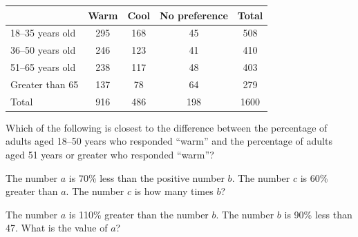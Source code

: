 \vspace{1em}
\begin{center}
    

\begin{tabular}{|l|c|c|c|c|}
\hline
 & Warm & Cool & No preference & Total \\
\hline
18--35 years old & 295 & 168 & 45 & 508 \\
36--50 years old & 246 & 123 & 41 & 410 \\
51--65 years old & 238 & 117 & 48 & 403 \\
Greater than 65 & 137 & 78 & 64 & 279 \\
\hline
Total & 916 & 486 & 198 & 1600 \\
\hline
\end{tabular}
\end{center}

\vspace{1em}

Which of the following is closest to the difference between the percentage of adults aged 18--50 years who responded “warm” and the percentage of adults aged 51 years or greater who responded “warm”?

\vspace{0.75em}


\vspace{2em}

\newpage

\noindent\markforreview
\vspace{1em}

The number $a$ is 70\% less than the positive number $b$.  
The number $c$ is 60\% greater than $a$.  
The number $c$ is how many times $b$?

\vspace{0.75em}



\vspace{5em}

\noindent\markforreview
\vspace{1em}

The number $a$ is 110\% greater than the number $b$.  
The number $b$ is 90\% less than 47.  
What is the value of $a$?

\vspace{0.75em}


\vspace{5em}

\noindent\markforreview
\vspace{1em}

